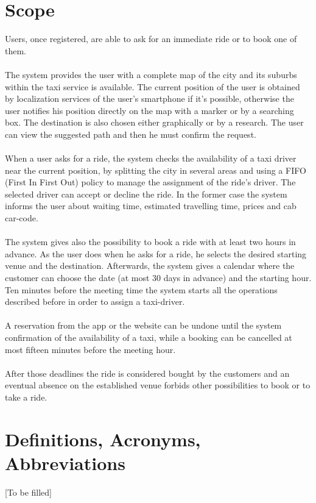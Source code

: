 \documentclass[../dd]{subfiles}
\begin{document}
\section{Scope}
Users, once registered, are able to ask for an immediate ride or to book one of them.\\
\\
The system provides the user with a complete map of the city and its suburbs within the taxi service is available. The current position of the user is obtained by localization services of the user's smartphone if it's possible, otherwise the user notifies his position directly on the map with a marker or by a searching box. The destination is also chosen either graphically or by a research. The user can view the suggested path and then he must confirm the request.\\
\\
When a user asks for a ride, the system checks the availability of a taxi driver near the current position, by splitting the city in several areas and using a FIFO (First In First Out) policy to manage the assignment of the ride's driver. The selected driver can accept or decline the ride. In the former case the system informs the user about waiting time, estimated travelling time, prices and cab car-code. \\
\\
The system gives also the possibility to book a ride with at least two hours in advance. As the user does when he asks for a ride, he selects the desired starting venue and the destination. Afterwards, the system gives a calendar where the customer can choose the date (at most 30 days in advance) and the starting hour. Ten minutes before the meeting time the system starts all the operations described before in order to assign a taxi-driver.\\
\\
A reservation from the app or the website can be undone until the system confirmation of the availability of a taxi, while a booking can be cancelled at most fifteen minutes before the meeting hour.\\
\\
After those deadlines the ride is considered bought by the customers and an eventual absence on the established venue forbids other possibilities to book or to take a ride.

\section{Definitions, Acronyms, Abbreviations}
[To be filled]
\end{document}
